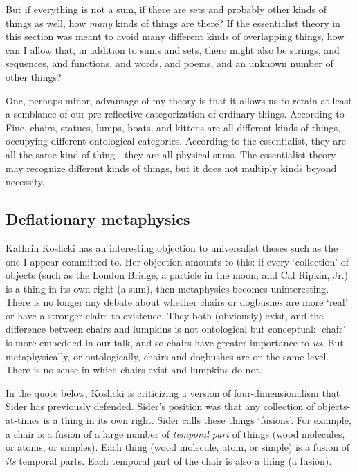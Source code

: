 \documentclass[11pt]{article}
\begin{document}
\begin{spacing}{1.5}
But if everything is not a sum, if there are sets and probably other
kinds of things as well, how {\em many} kinds of things are there?  If
the essentialist theory in this section was meant to avoid many
different kinds of overlapping things, how can I allow that, in
addition to sums and sets, there might also be strings, and sequences,
and functions, and words, and poems, and an unknown number of other
things?

One, perhaps minor, advantage of my theory is that it allows us to
retain at least a semblance of our pre-reflective categorization of
ordinary things.  According to Fine, chairs, statues, lumps, boats,
and kittens are all different kinds of things, occupying different
ontological categories.  According to the essentialist, they are all
the same kind of thing---they are all physical sums.  The essentialist
theory may recognize different kinds of things, but it does not
multiply kinds beyond necessity.

\subsection{Deflationary metaphysics}
\label{deflate}
Kathrin Koslicki has an interesting objection to universalist theses
such as the one I appear committed to.  Her objection amounts to this:
if every `collection' of objects (such as the London Bridge, a
particle in the moon, and Cal Ripkin, Jr.) is a thing in its own right
(a sum), then metaphysics becomes uninteresting.  There is no longer
any debate about whether chairs or dogbushes are more `real' or have a
stronger claim to existence.  They both (obviously) exist, and the
difference between chairs and lumpkins is not ontological but
conceptual: `chair' is more embedded in our talk, and so chairs have
greater importance to {\em us}.  But metaphysically, or ontologically,
chairs and dogbushes are on the same level.  There is no sense in
which chairs exist and lumpkins do not.

In the quote below, Koslicki is criticizing a version of
four-dimensionalism that Sider has previously defended.  Sider's
position was that any collection of objects-at-times is a thing in its
own right.  Sider calls these things `fusions'.  For example, a chair
is a fusion of a large number of {\em temporal part} of things (wood
molecules, or atoms, or simples).  Each thing (wood molecule, atom, or
simple) is a fusion of {\em its} temporal parts.  Each temporal part
of the chair is also a thing (a fusion).


\end{spacing}
\end{document}
